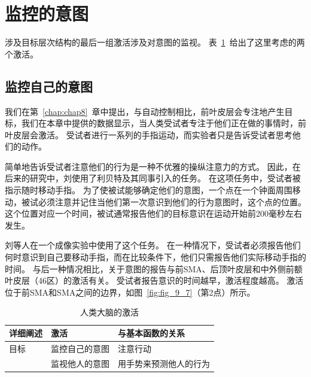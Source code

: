 \section{监控的意图}
\par
涉及目标层次结构的最后一组激活涉及对意图的监视。
表~\ref{tab:9_4}~给出了这里考虑的两个激活。
\par


\subsection{监控自己的意图}
\par
我们在第~\ref{chap:chap8}~章中提出，与自动控制相比，前叶皮层会专注地产生目标，我们在本章中提供的数据显示，当人类受试者专注于他们正在做的事情时，前叶皮层会激活\cite{rowe2002attention}。
受试者进行一系列的手指运动，而实验者只是告诉受试者思考他们的动作。
\par


简单地告诉受试者注意他们的行为是一种不优雅的操纵注意力的方式。
因此，在后来的研究中，刘\cite{lau2004willed}使用了利贝特及其同事\cite{libet1993time}引入的任务。
在这项任务中，受试者被指示随时移动手指。
为了使被试能够确定他们的意图，一个点在一个钟面周围移动，被试必须注意并记住当他们第一次意识到他们的行为意图时，这个点的位置。
这个位置对应一个时间，被试通常报告他们的目标意识在运动开始前200毫秒左右发生。
\par


刘等人\cite{lau2004willed}在一个成像实验中使用了这个任务。
在一种情况下，受试者必须报告他们何时意识到自己要移动手指，而在比较条件下，他们只需报告他们实际移动手指的时间。
与后一种情况相比，关于意图的报告与前SMA、后顶叶皮层和中外侧前额叶皮层（46区）的激活有关。
受试者报告意识的时间越早，激活程度越高\cite{lau2006measuring}。
激活位于前SMA和SMA之间的边界，如图~\ref{fig:fig_9_7}（第2点）所示。
\par


\begin{table}[htbp] 
	\newcommand{\tabincell}[2]{\begin{tabular}{@{}#1@{}}#2\end{tabular}} %
	\centering
	\caption{人类大脑的激活\label{tab:9_4}}
	\renewcommand\arraystretch{1.5}	%
	\begin{tabular}{lll}
		\toprule
		详细阐述 & 激活 & 与基本函数的关系\\
		\midrule
		目标 & 监控自己的意图 & 注意行动  \\
		& 监视他人的意图 & 用手势来预测他人的行为 \\
		\bottomrule
		
	\end{tabular}%
\end{table}%


